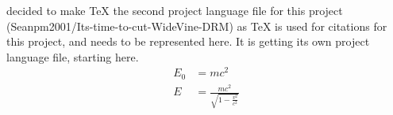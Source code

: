 \documentclass{article} %
\title{\ProjectLanguageFileTwo} %
\begin{document}
  \maketitle
  \I decided to make TeX the second project language file for this project (Seanpm2001/Its-time-to-cut-WideVine-DRM) as TeX is used for citations for this project, and needs to be represented here. It is getting its own project language file, starting here.
  \begin{align}
    E_0 &= mc^2 \\
    E &= \frac{mc^2}{\sqrt{1-\frac{v^2}{c^2}}}
  \end{align} 
\end{document}
